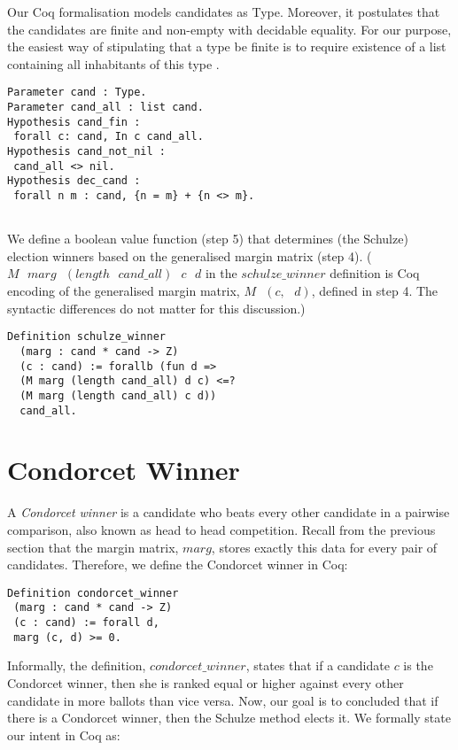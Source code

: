 \documentclass[compsoc,conference,a4paper,10pt,times]{IEEEtran}
\begin{document}
Our Coq formalisation models candidates as Type. Moreover, it postulates that the candidates 
are finite and non-empty with decidable equality. For our purpose, 
the easiest way of stipulating that a type be finite is to require existence of a 
list containing all inhabitants of this type \cite{10.1145/2808098.2808102}.

 \begin{verbatim}
Parameter cand : Type.
Parameter cand_all : list cand.
Hypothesis cand_fin : 
 forall c: cand, In c cand_all.
Hypothesis cand_not_nil : 
 cand_all <> nil.
Hypothesis dec_cand : 
 forall n m : cand, {n = m} + {n <> m}.


\end{verbatim}


We define a boolean value function (step 5) that determines 
(the Schulze) election winners based on 
the generalised margin matrix (step 4). ($M \text{ } marg \text{ } 
(length \text{ } cand\_all) \text{ } c \text{ } d$ 
in the $schulze\_winner$ definition is Coq encoding of the generalised margin matrix, 
$M \text{ } (c, \text{ }d)$, defined in step 4. The syntactic differences do not matter 
for this discussion.)
 \begin{verbatim}
Definition schulze_winner 
  (marg : cand * cand -> Z) 
  (c : cand) := forallb (fun d => 
  (M marg (length cand_all) d c) <=? 
  (M marg (length cand_all) c d))
  cand_all.
\end{verbatim}


 
 \section{Condorcet Winner}
	A \textit{Condorcet winner} is a candidate who beats every other candidate in a 
	pairwise comparison, also known as head to head competition. 
	Recall from the previous section that the margin matrix, $marg$, 
	stores exactly this data for every pair of candidates.
	Therefore, we define the Condorcet winner in Coq:

\begin{verbatim}
Definition condorcet_winner 
 (marg : cand * cand -> Z) 
 (c : cand) := forall d, 
 marg (c, d) >= 0.
\end{verbatim}

  Informally, the definition,  $condorcet\_winner$, states that 
  if a candidate $c$  is the Condorcet winner, then she is
  ranked equal or higher against
  every other candidate in more ballots than vice versa. 
  Now, our goal is to concluded that if there is a 
  Condorcet winner, then the Schulze method
  elects it. We formally state our intent 
  in Coq as:
 	
\end{document}
